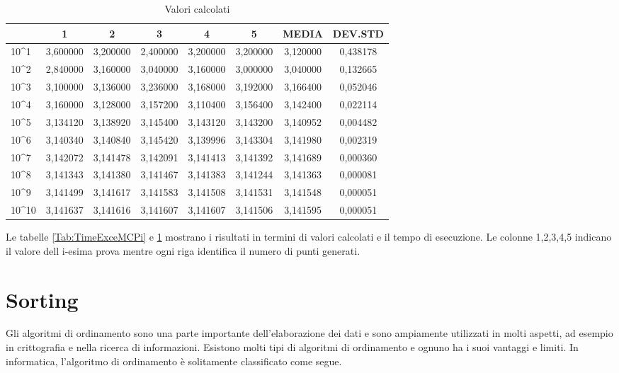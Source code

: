 \documentclass[12pt,a4paper]{report}
\begin{document}
\begin{table}[h]
\begin{tabular}{|l|c|c|c|c|c|c|c|}
\hline
               & 1        & 2        & 3        & 4        & 5        & MEDIA    & DEV.STD  \\ \hline
10\textasciicircum{}1  & 3,600000 & 3,200000 & 2,400000 & 3,200000 & 3,200000 & 3,120000 & 0,438178 \\ \hline
10\textasciicircum{}2  & 2,840000 & 3,160000 & 3,040000 & 3,160000 & 3,000000 & 3,040000 & 0,132665 \\ \hline
10\textasciicircum{}3  & 3,100000 & 3,136000 & 3,236000 & 3,168000 & 3,192000 & 3,166400 & 0,052046 \\ \hline
10\textasciicircum{}4  & 3,160000 & 3,128000 & 3,157200 & 3,110400 & 3,156400 & 3,142400 & 0,022114 \\ \hline
10\textasciicircum{}5  & 3,134120 & 3,138920 & 3,145400 & 3,143120 & 3,143200 & 3,140952 & 0,004482 \\ \hline
10\textasciicircum{}6  & 3,140340 & 3,140840 & 3,145420 & 3,139996 & 3,143304 & 3,141980 & 0,002319 \\ \hline
10\textasciicircum{}7  & 3,142072 & 3,141478 & 3,142091 & 3,141413 & 3,141392 & 3,141689 & 0,000360 \\ \hline
10\textasciicircum{}8  & 3,141343 & 3,141380 & 3,141467 & 3,141383 & 3,141244 & 3,141363 & 0,000081 \\ \hline
10\textasciicircum{}9  & 3,141499 & 3,141617 & 3,141583 & 3,141508 & 3,141531 & 3,141548 & 0,000051 \\ \hline
10\textasciicircum{}10 & 3,141637 & 3,141616 & 3,141607 & 3,141607 & 3,141506 & 3,141595 & 0,000051 \\ \hline
\end{tabular}
\caption{Valori calcolati}
\label{Tab:ValueMCPi}
\end{table}

Le tabelle \ref{Tab:TimeExceMCPi} e \ref{Tab:ValueMCPi} mostrano i risultati in termini di valori calcolati e il tempo di esecuzione. Le colonne 1,2,3,4,5 indicano il valore dell i-esima prova mentre ogni riga identifica il numero di punti generati.

\section{Sorting}
Gli algoritmi di ordinamento sono una parte importante dell'elaborazione dei dati e sono ampiamente utilizzati in molti aspetti, ad esempio in crittografia e nella ricerca di informazioni. Esistono molti tipi di algoritmi di ordinamento e ognuno ha i suoi vantaggi e limiti. In informatica, l'algoritmo di ordinamento è solitamente classificato come segue.
\end{document}
